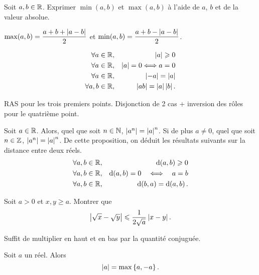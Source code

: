 \documentclass{magnolia}
\begin{document}
\begin{exoUnique}
\exo Soit $a,b\in\mathbb{R}$. Exprimer $\min(a,b)$ et $\max(a,b)$
  à l'aide de $a$, $b$ et de la valeur absolue.
\end{exoUnique}
\begin{sol}
$\max(a,b)=\dfrac{a+b+\left|a-b\right|}{2}$ et $\min(a,b)=\dfrac{a+b-\left|a-b\right|}{2}$.
\end{sol}

\begin{proposition}
\begin{eqnarray*}
\forall a\in\mathbb{R}, & & \left|a\right|\geqslant 0\\
\forall a\in\mathbb{R}, & & \left|a\right|=0 \Longleftrightarrow a=0\\
\forall a\in\mathbb{R}, & & \left|-a\right|=\left|a\right|\\
\forall a,b\in\mathbb{R}, & & \left|ab\right|=\left|a\right|\left|b\right|.
\end{eqnarray*}
\end{proposition}
\begin{preuve}
RAS pour les trois premiers points. Disjonction de 2 cas + inversion des rôles pour le quatrième point.
\end{preuve}

\begin{remarques}
\remarque Soit $a\in\mathbb{R}$. Alors, quel que soit $n\in\mathbb{N}$, $\left|a^n\right|=\left|a\right|^n$. Si de
  plus $a\neq 0$, quel que soit $n\in\mathbb{Z}$, $\left|a^n\right|=\left|a\right|^n$. 
\remarque De cette proposition, on déduit les résultats suivants sur la distance
  entre deux réels.
  \begin{eqnarray*}
  \forall a,b\in\mathbb{R}, & & {\rm d}\!\left(a,b\right)\geqslant 0\\
  \forall a,b\in\mathbb{R}, & & {\rm d}\!\left(a,b\right)=0 \quad\Longleftrightarrow\quad a=b\\
  \forall a,b\in\mathbb{R}, & & {\rm d}\!\left(b,a\right)={\rm d}\!\left(a,b\right).
  \end{eqnarray*}
\end{remarques}

\begin{exoUnique}
\exo Soit $a>0$ et $x,y\geq a$. Montrer que
  \[\left|\sqrt{x}-\sqrt{y}\right|\leqslant\frac{1}{2\sqrt{a}}\left|x-y\right|.\]
	\begin{sol}
	Suffit de multiplier en haut et en bas par la quantité conjuguée.
	\end{sol}
\end{exoUnique}



\begin{proposition}
Soit $a$ un réel. Alors
\[\left|a\right|=\max\left\{a,-a\right\}.\]
\end{proposition}
\end{document}
